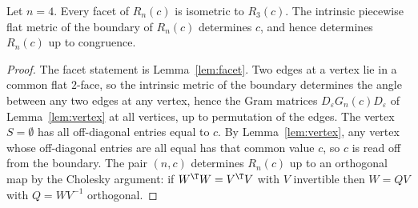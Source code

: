 \begin{theorem}\label{thm:main}
Let $n=4$. Every facet of $R_n(c)$ is isometric to $R_{3}(c)$.
The intrinsic piecewise flat metric of the boundary of $R_n(c)$ determines $c$, and hence determines $R_n(c)$ up to congruence.
\end{theorem}
\begin{proof}
The facet statement is Lemma~\ref{lem:facet}.
Two edges at a vertex lie in a common flat $2$-face, so the intrinsic metric of the boundary determines the angle between any two edges at any vertex, hence the Gram matrices $D_\varepsilon G_n(c)D_\varepsilon$ of Lemma~\ref{lem:vertex} at all vertices, up to permutation of the edges. The vertex $S=\emptyset$ has all off-diagonal entries equal to $c$. By Lemma~\ref{lem:vertex}, any vertex whose off-diagonal entries are all equal has that common value $c$, so $c$ is read off from the boundary. The pair $(n,c)$ determines $R_n(c)$ up to an orthogonal map by the Cholesky argument: if $W^\T W=V^\T V$ with $V$ invertible then $W=QV$ with $Q=WV^{-1}$ orthogonal.
\end{proof}
